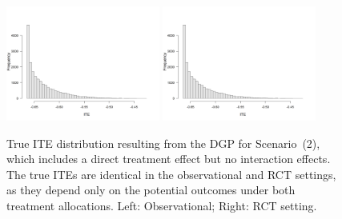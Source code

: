 \begin{figure}[htbp]
\centering
\includegraphics[width=0.45\textwidth]{img/results/observ_scenario2_ite_distribution_dgp.png}
\includegraphics[width=0.45\textwidth]{img/results/rct_scenario2_ite_distribution_dgp.png}
\caption{True ITE distribution resulting from the DGP for Scenario~(2), which includes a direct treatment effect but no interaction effects. The true ITEs are identical in the observational and RCT settings, as they depend only on the potential outcomes under both treatment allocations. Left: Observational; Right: RCT setting.}
\label{fig:scenario2_ite_distribution_dgp}
\end{figure}



